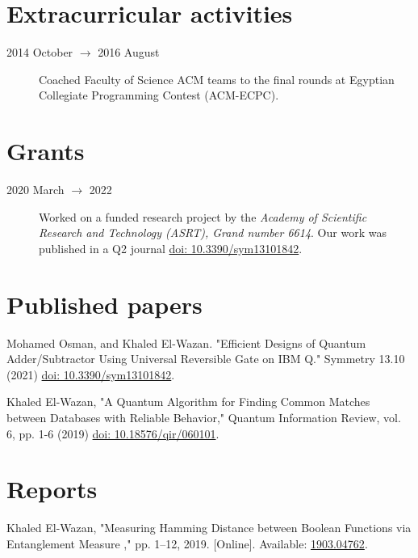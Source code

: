 \documentclass[margin,line]{resume}
\newcommand*{\doi}[1]{\href{http://dx.doi.org/#1}{doi: #1}}
\begin{document}
\begin{resume}
\begin{description}
	\end{description}



	\section{\mysidestyle Extracurricular activities}\vspace{1mm}
	\begin{description}
		\item[2014 October $\rightarrow$ 2016 August] Coached Faculty of Science ACM teams to the final rounds at Egyptian Collegiate Programming Contest (ACM-ECPC).

	\end{description}

	\section{\mysidestyle Grants}
	\begin{description}
		\item[2020 March $\rightarrow$ 2022] Worked on a funded research project by the \textit{Academy of Scientific Research and Technology (ASRT), Grand number 6614}. Our work was published in a Q2 journal \doi{10.3390/sym13101842}.
	\end{description}


	\section{ \mysidestyle Published papers}

	Mohamed Osman, and Khaled El-Wazan. "Efficient Designs of Quantum Adder/Subtractor Using Universal Reversible Gate on IBM Q." Symmetry 13.10 (2021) \doi{10.3390/sym13101842}.


	Khaled El-Wazan, "A Quantum Algorithm for Finding Common Matches between Databases with Reliable Behavior," Quantum Information Review, vol. 6, pp. 1-6 (2019) \doi{10.18576/qir/060101}.


	\section{\mysidestyle Reports}

	Khaled El-Wazan, "Measuring Hamming Distance between Boolean Functions via Entanglement Measure ,"  pp. 1--12, 2019.
		[Online]. Available: \href{http://arxiv.org/abs/1903.04762}{1903.04762}.




\end{resume}
\end{document}
